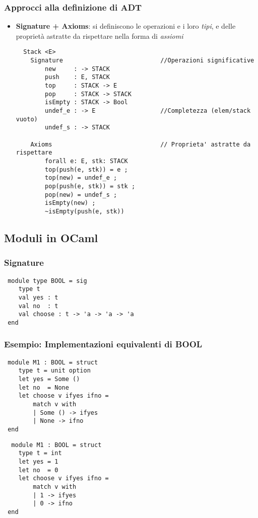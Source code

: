 \documentclass[a4paper,10pt]{article}
\begin{document}
\subsubsection{Approcci alla definizione di ADT}
\begin{itemize}
 \item \textbf{Signature + Axioms}: si definiscono le operazioni e i loro \emph{tipi}, e delle proprietà astratte da rispettare nella forma di \emph{assiomi}
 
 \begin{lstlisting}
  Stack <E>
    Signature                           //Operazioni significative
        new     : -> STACK
        push    : E, STACK
        top     : STACK -> E
        pop     : STACK -> STACK
        isEmpty : STACK -> Bool
        undef_e : -> E                  //Completezza (elem/stack vuoto)
        undef_s : -> STACK
    
    Axioms                              // Proprieta' astratte da rispettare
        forall e: E, stk: STACK
        top(push(e, stk)) = e ;
        top(new) = undef_e ;
        pop(push(e, stk)) = stk ;
        pop(new) = undef_s ;
        isEmpty(new) ;
        ~isEmpty(push(e, stk))
 \end{lstlisting}

\end{itemize}
\subsection{Moduli in OCaml}
\subsubsection{Signature}
\begin{lstlisting}
 module type BOOL = sig
    type t
    val yes : t
    val no  : t
    val choose : t -> 'a -> 'a -> 'a
 end
\end{lstlisting}

\subsubsection{Esempio: Implementazioni equivalenti di BOOL}
\begin{multicols}{2}
 \begin{lstlisting}
 module M1 : BOOL = struct
    type t = unit option
    let yes = Some ()
    let no  = None
    let choose v ifyes ifno =
        match v with
        | Some () -> ifyes
        | None -> ifno
 end\end{lstlisting}

 \begin{lstlisting}
  module M1 : BOOL = struct
    type t = int
    let yes = 1
    let no  = 0
    let choose v ifyes ifno =
        match v with
        | 1 -> ifyes
        | 0 -> ifno
 end\end{lstlisting}

\end{multicols}
\end{document}
